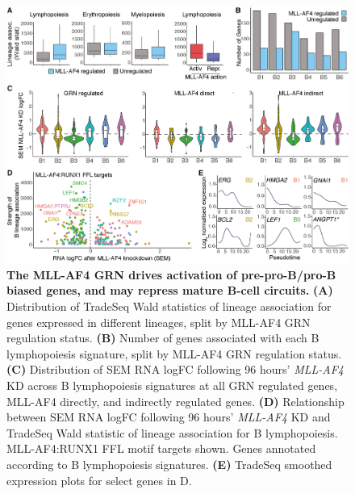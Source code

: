 \begin{figure}[htbp]
    \centering
    \includegraphics[width=\textwidth,height=\textheight,keepaspectratio]{figures/chapter4/ch4_multiome-grn.png}
    \caption[{The MLL-AF4 GRN drives activation of pre-pro-B/pro-B biased genes, and may repress mature B-cell circuits.}]
    {\textbf{The MLL-AF4 GRN drives activation of pre-pro-B/pro-B biased genes, and may repress mature B-cell circuits.} 
    \textbf{(A)} Distribution of TradeSeq Wald statistics of lineage association for genes expressed in different lineages, split by MLL-AF4 GRN regulation status.
    \textbf{(B)} Number of genes associated with each B lymphopoiesis signature, split by MLL-AF4 GRN regulation status.
    \textbf{(C)} Distribution of SEM RNA logFC following 96 hours' \textit{MLL-AF4} KD across B lymphopoiesis signatures at all GRN regulated genes, MLL-AF4 directly, and indirectly regulated genes. 
    \textbf{(D)} Relationship between SEM RNA logFC following 96 hours' \textit{MLL-AF4} KD and TradeSeq Wald statistic of lineage association for B lymphopoiesis. MLL-AF4:RUNX1 FFL motif targets shown. Genes annotated according to B lymphopoiesis signatures.
    \textbf{(E)} TradeSeq smoothed expression plots for select genes in D.
    }
    \label{fig:ch4_multiome-grn}
\end{figure}


